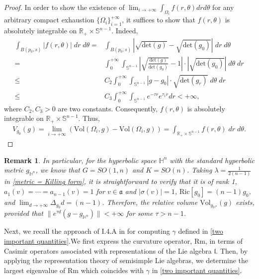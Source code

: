 \documentclass[12pt]{amsart}
\newtheorem{remark}{Remark}[section]
\begin{document}
\begin{proof}
    In order to show the existence of $\lim_{i \rightarrow +\infty} \int_{\Omega_{i}}f(r, \theta)dr d\theta$ for any arbitrary compact exhaustion $\{\Omega_i\}_{i = 1}^{+\infty}$, it suffices to show that $f(r, \theta)$ is absolutely integrable on $\mathbb{R}_+ \times \mathbb{S}^{n - 1}$. 
    Indeed, 
    \begin{align*}
         \int_{B(p_0, s)} |f(r, \theta)|\; dr\; d\theta =&  \int_{B(p_0, s)}|\sqrt{\mathrm{det}(g)} - \sqrt{\mathrm{det}(g_0)}|\; dr\; d\theta\\
        =&  \int_{0}^{+\infty} \int_{\mathbb{S}^{n - 1}}|\sqrt{\frac{\mathrm{det}(g)}{\mathrm{det}(g_0)}} - 1|\cdot |\sqrt{\mathrm{det}(g_0)}|\; d\theta\; dr\\
        \leq& C_2 \int_{0}^{+\infty} \int_{\mathbb{S}^{n - 1}}|g - g_0|\cdot \sqrt{\mathrm{det}(g_r)}\; d\theta\; dr\\
        \leq& C_3 \int_{0}^{+\infty} \int_{\mathbb{S}^{n - 1}} e^{-\tau r} e^{\tau_1 r} dr < +\infty,
    \end{align*}  
    where $C_2, C_3 > 0$ are two constants. Consequently, $f(r, \theta)$ is absolutely integrable on $\mathbb{R}_+ \times \mathbb{S}^{n - 1}$. Thus, 
    \begin{align*}
        V_{g_0}(g) = \lim_{i\rightarrow+\infty}(\mathrm{Vol}(\Omega_i, g) - \mathrm{Vol}(\Omega_i, g)) = \int_{\mathbb{R}_{+}\times \mathbb{S}^{n - 1}} f(r, \theta) \; dr\; d\theta.
    \end{align*}
\end{proof}
\begin{remark}
    In particular, for the hyperbolic space $\mathbb{H}^{n}$ with the standard hyperbolic metric $g_{\mathbb{H}^n}$, we know that $G = SO(1, n)$ and $K = SO(n)$. Taking $\lambda = \frac{1}{2(n - 1)}$ in \eqref{metric = Killing form}, it is straightforward to verify that it is of rank 1, $a_1(v) = \cdots = a_{n - 1}(v) = 1$ for $v\in \mathfrak{a}$ and $|\sigma(v)| = 1$, $\mathrm{Ric}[g_0] = (n - 1)g_0$, and  $\lim_{d\rightarrow+\infty}\Delta_{g_0} d = (n - 1)$. Therefore, the relative volume $\mathrm{Vol}_{g_{\mathbb{H}^{n }}}(g)$ exists, provided that $\|e^{\tau d} (g - g_{\mathbb{H}^n})\| < +\infty$ for some $\tau > n - 1$.
\end{remark}

Next, we recall the approach of I.4.A in \cite{Bi2006} for computing $\gamma$ defined in \eqref{two important quantities}.We first express the curvature operator, $\mathrm{Rm}$, in terms of Casimir operators associated with representations of the Lie algebra $\mathfrak{l}$. Then, by applying the representation theory of semisimple Lie algebras, we determine the largest eigenvalue of $\mathrm{Rm}$ which coincides with $\gamma$ in \eqref{two important quantities}. 
\end{document}
